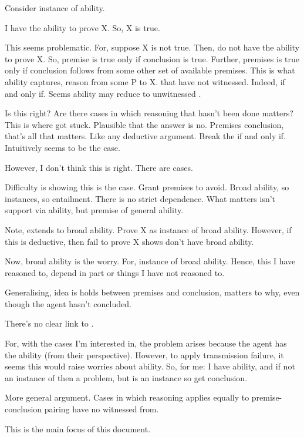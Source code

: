 \begin{note}
  Consider instance of ability.

  I have the ability to prove X.
  So, X is true.

  This seems problematic.
  For, suppose X is not true.
  Then, do not have the ability to prove X.
  So, premise is true only if conclusion is true.
  Further, premises is true only if conclusion follows from some other set of available premises.
  This is what ability captures, reason from some P to X.
   that have not witnessed.
  Indeed, if and only if.
  Seems ability may reduce to unwitnessed \support{}.

  Is this right?
  Are there cases in which reasoning that hasn't been done matters?
  This is where got stuck.
  Plausible that the answer is no.
  Premises conclusion, that's all that matters.
  Like any deductive argument.
  Break the if and only if.
  Intuitively seems to be the case.

  However, I don't think this is right.
  There are cases.

  Difficulty is showing this is the case.
  Grant premises to avoid.
  Broad ability, so instances, so entailment.
  There is no strict dependence.
  What matters isn't support via ability, but premise of general ability.

  Note, extends to broad ability.
  Prove X as instance of broad ability.
  However, if this is deductive, then fail to prove X shows don't have broad ability.

  Now, broad ability is the worry.
  For, instance of broad ability.
  Hence, this I have reasoned to, depend in part or things I have not reasoned to.

  Generalising, idea is \support{} holds between premises and conclusion, matters to why, even though the agent hasn't concluded.

\end{note}

\begin{note}
  \color{red}
  There's no clear link to \citeauthor{Wright:2011wn}.

  For, with the cases I'm interested in, the problem arises because the agent has the \abgen{} ability (from their perspective).
  However, to apply transmission failure, it seems this would raise worries about ability.
  So, for me:
  I have \abgen{} ability, and if not an instance of \abgen{} then a problem, but is an instance so get conclusion.
\end{note}

\begin{note}
  More general argument.
  Cases in which reasoning applies equally to premise-conclusion pairing have no witnessed from.

  This is the main focus of this document.
\end{note}


